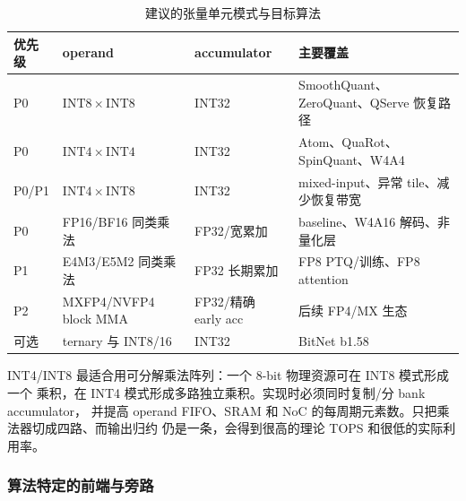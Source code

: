 \begin{table}[H]
  \centering
  \small
  \caption{建议的张量单元模式与目标算法}
  \label{tab:npu-mode-priority}
  \begin{tabular}{p{2.1cm}p{3.3cm}p{3.5cm}p{4.5cm}}
    \toprule
    优先级 & operand & accumulator & 主要覆盖 \\
    \midrule
    P0 & $\mathrm{INT8}\times\mathrm{INT8}$ & INT32 & SmoothQuant、ZeroQuant、QServe 恢复路径 \\
    P0 & $\mathrm{INT4}\times\mathrm{INT4}$ & INT32 & Atom、QuaRot、SpinQuant、W4A4 \\
    P0/P1 & $\mathrm{INT4}\times\mathrm{INT8}$ & INT32 & mixed-input、异常 tile、减少恢复带宽 \\
    P0 & FP16/BF16 同类乘法 & FP32/宽累加 & baseline、W4A16 解码、非量化层 \\
    P1 & E4M3/E5M2 同类乘法 & FP32 长期累加 & FP8 PTQ/训练、FP8 attention \\
    P2 & MXFP4/NVFP4 block MMA & FP32/精确 early acc & 后续 FP4/MX 生态 \\
    可选 & ternary 与 INT8/16 & INT32 & BitNet b1.58 \\
    \bottomrule
  \end{tabular}
\end{table}

INT4/INT8 最适合用可分解乘法阵列：一个 8-bit 物理资源可在 INT8 模式形成一个
乘积，在 INT4 模式形成多路独立乘积。实现时必须同时复制/分 bank accumulator，
并提高 operand FIFO、SRAM 和 NoC 的每周期元素数。只把乘法器切成四路、而输出归约
仍是一条，会得到很高的理论 TOPS 和很低的实际利用率。

\subsubsection{算法特定的前端与旁路}

